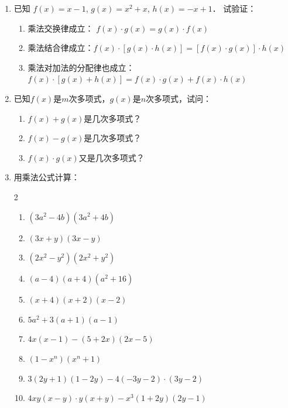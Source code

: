 \begin{enumerate}
\item 已知 $f(x)=x-1$, $g(x)=x^{2}+x$, $h(x)=-x+1$．
试验证：
\begin{enumerate}
    \item 乘法交换律成立： $f(x) \cdot g(x)=g(x) \cdot f(x)$
    \item 乘法结合律成立：$f(x) \cdot[g(x) \cdot h(x)]=[f(x) \cdot g(x)] \cdot h(x)$
    \item 乘法对加法的分配律也成立：$f(x) \cdot[g(x) + h(x)]=f(x) \cdot g(x)+f(x) \cdot h(x)$
\end{enumerate}

\item 已知$f(x)$是$m$次多项式，$g(x)$是$n$次多项式，试问：
\begin{enumerate}
    \item $f(x)+g(x)$是几次多项式？
    \item $f(x)-g(x)$是几次多项式？
    \item $f(x)·g(x)$又是几次多项式？
\end{enumerate}

\item 用乘法公式计算：
   \begin{multicols}{2}
    \begin{enumerate}
        \item $(3a^2-4b) (3a^2+4b)$
        \item $(3x+y) (3x-y)$
        \item $(2x^2-y^2) (2x^2+y^2)$
        \item $(a-4) (a+4)(a^2+16)$
        \item $(x+4) (x+2)(x-2)$
        \item $5a^2+3 (a+1) (a-1)$
        \item $4x (x-1) - (5+2x) (2x-5)$
        \item $(1-x^n) (x^n+1)$
        \item $3(2y+1) (1-2y)-4(-3y-2)\cdot (3y-2)$
        \item $4xy(x-y) \cdot y(x+y) - x^3(1+2y)(2y-1)$
    \end{enumerate}
   \end{multicols}



\end{enumerate}
